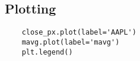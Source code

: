 \documentclass[KSmain.tex]{subfiles}
\begin{document}
\newpage
\subsection{Plotting}

\begin{framed}
	\begin{verbatim}
	close_px.plot(label='AAPL')
	mavg.plot(label='mavg')
	plt.legend()
	
	\end{verbatim}
\end{framed}
\end{document}
